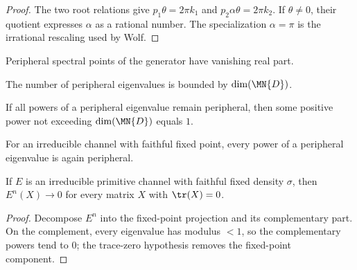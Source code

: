 \begin{proof}
    \leanok
    The two root relations give $p_1\theta=2\pi k_1$ and
    $p_2\alpha\theta=2\pi k_2$.  If $\theta\ne0$, their quotient expresses
    $\alpha$ as a rational number.  The specialization $\alpha=\pi$ is the
    irrational rescaling used by Wolf.
\end{proof}

\begin{theorem}
    \leanok
    Peripheral spectral points of the generator have vanishing real part.
\end{theorem}

\begin{theorem}
    \leanok
    The number of peripheral eigenvalues is bounded by $\dim(\MN{D})$.
\end{theorem}

\begin{theorem}
    \leanok
    If all powers of a peripheral eigenvalue remain peripheral, then some
    positive power not exceeding $\dim(\MN{D})$ equals $1$.
\end{theorem}

\begin{theorem}
    \leanok
    For an irreducible channel with faithful fixed point, every power of a
    peripheral eigenvalue is again peripheral.
\end{theorem}

\begin{theorem}
    \label{thm:primitive_channel_pow_tendsto_zero_ch12}
    \leanok
    If $E$ is an irreducible primitive channel with faithful fixed density $\sigma$,
    then $E^n(X)\to 0$ for every matrix $X$ with $\tr(X)=0$.
\end{theorem}

\begin{proof}
    \leanok
    Decompose $E^n$ into the fixed-point projection and its complementary part.
    On the complement, every eigenvalue has modulus $<1$, so the complementary powers
    tend to $0$; the trace-zero hypothesis removes the fixed-point component.
\end{proof}

